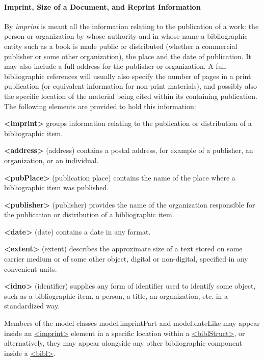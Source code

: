 \paragraph[{Imprint, Size of a Document, and Reprint Information}]{Imprint, Size of a Document, and Reprint Information}\label{COBICOI}\par
By \textit{imprint} is meant all the information relating to the publication of a work: the person or organization by whose authority and in whose name a bibliographic entity such as a book is made public or distributed (whether a commercial publisher or some other organization), the place and the date of publication. It may also include a full address for the publisher or organization. A full bibliographic references will usually also specify the number of pages in a print publication (or equivalent information for non-print materials), and possibly also the specific location of the material being cited within its containing publication. The following elements are provided to hold this information: 
\begin{sansreflist}
  
\item [\textbf{<imprint>}] groups information relating to the publication or distribution of a bibliographic item.
\item [\textbf{<address>}] (address) contains a postal address, for example of a publisher, an organization, or an individual.
\item [\textbf{<pubPlace>}] (publication place) contains the name of the place where a bibliographic item was published.
\item [\textbf{<publisher>}] (publisher) provides the name of the organization responsible for the publication or distribution of a bibliographic item.
\item [\textbf{<date>}] (date) contains a date in any format.
\item [\textbf{<extent>}] (extent) describes the approximate size of a text stored on some carrier medium or of some other object, digital or non-digital, specified in any convenient units.
\item [\textbf{<idno>}] (identifier) supplies any form of identifier used to identify some object, such as a bibliographic item, a person, a title, an organization, etc. in a standardized way.
\end{sansreflist}
 Members of the model classes \textsf{model.imprintPart} and \textsf{model.dateLike} may appear inside an \hyperref[TEI.imprint]{<imprint>} element in a specific location within a \hyperref[TEI.biblStruct]{<biblStruct>}, or alternatively, they may appear alongside any other bibliographic component inside a \hyperref[TEI.bibl]{<bibl>}. 

